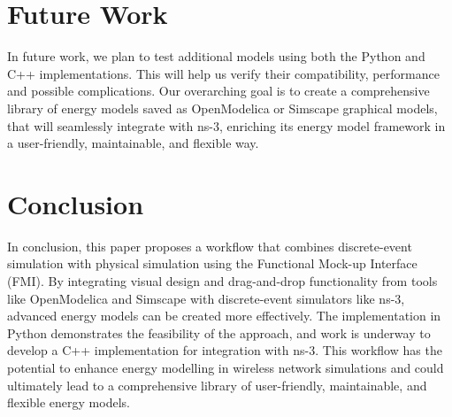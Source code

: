 \documentclass[conference]{IEEEtran}
\def\ns3{ns-3}
\begin{document}
\section{Future Work}

In future work, we plan to test additional models using both the Python and C++ implementations. This will help us verify their compatibility, performance and possible complications.
Our overarching goal is to create a comprehensive library of energy models saved as OpenModelica or Simscape graphical models, that will seamlessly integrate with \ns3, enriching its energy model framework in a user-friendly, maintainable, and flexible way.

\section{Conclusion}
In conclusion, this paper proposes a workflow that combines discrete-event simulation with physical simulation using the Functional Mock-up Interface (FMI). By integrating visual design and drag-and-drop functionality from tools like OpenModelica and Simscape with discrete-event simulators like ns-3, advanced energy models can be created more effectively. The implementation in Python demonstrates the feasibility of the approach, and work is underway to develop a C++ implementation for integration with ns-3. This workflow has the potential to enhance energy modelling in wireless network simulations and could ultimately lead to a comprehensive library of user-friendly, maintainable, and flexible energy models.

\printbibliography
\end{document}
